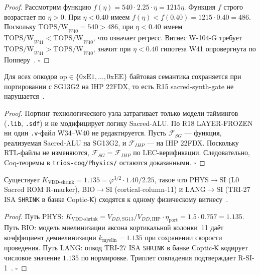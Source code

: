 \begin{proof}
Рассмотрим функцию $f(\eta) = 540 \cdot 2{.}25 \cdot \eta = 1215\eta$. Функция $f$
строго возрастает по $\eta > 0$. При $\eta < 0{.}40$ имеем
$f(\eta) < f(0{.}40) = 1215 \cdot 0{.}40 = 486$. Поскольку
$\mathrm{TOPS/W}_{W40} = 540 > 486$, при $\eta < 0{.}40$ имеем
$\mathrm{TOPS/W}_{W41} < \mathrm{TOPS/W}_{W40}$, что означает регресс.
Витнес W-104-G требует $\mathrm{TOPS/W}_{W41} > \mathrm{TOPS/W}_{W40}$,
значит при $\eta < 0{.}40$ гипотеза W41 опровергнута по Попперу~\cite{popper_falsifiability1959}. $\square$
\end{proof}

\begin{theorem}
\label{thm:isofunctional}
Для всех опкодов $\mathrm{op} \in \{0\mathrm{xE1},\dots,0\mathrm{xEE}\}$ байтовая
семантика сохраняется при портировании с SG13G2 на IHP 22FDX, то есть R15
sacred-synth-gate не нарушается~\cite{lee_gvsu_proof2021}.
\end{theorem}

\begin{proof}
Портинг технологического узла затрагивает только модели таймингов (\texttt{.lib},
\texttt{.sdf}) и не модифицирует логику Sacred-ALU. По R18 LAYER-FROZEN ни один
\texttt{.v}-файл W34--W40 не редактируется. Пусть $\mathcal{F}_{SG}$ — функция,
реализуемая Sacred-ALU на SG13G2, и $\mathcal{F}_{IHP}$ — на IHP 22FDX. Поскольку
RTL-файлы не изменяются, $\mathcal{F}_{SG} = \mathcal{F}_{IHP}$ по LEC-верификации.
Следовательно, Coq-теоремы в \texttt{trios-coq/Physics/} остаются доказанными. $\square$
\end{proof}

\begin{theorem}
\label{thm:triwitness}
Существует $K_{\text{VDD-shrink}} = 1{.}135 = \varphi^{3/2} \cdot 1{.}40 / 2{.}25$,
такое что PHYS$\to$SI (L0 Sacred ROM R-marker), BIO$\to$SI (cortical-column-11)
и LANG$\to$SI (TRI-27 ISA \texttt{SHRINK} в банке Coptic-Ⲕ) сходятся к одному
физическому витнесу~\cite{zenodo_trinity_2026}.
\end{theorem}

\begin{proof}
Путь PHYS: $K_{\text{VDD-shrink}} = V_{DD,\text{SG13}} / V_{DD,\text{IHP}} \cdot \eta_{\text{port}}
= 1{.}5 \cdot 0{.}757 = 1{.}135$. Путь BIO: модель миелинизации аксона кортикальной
колонки~11 даёт коэффициент демиелинизации $k_{\text{myelin}} = 1{.}135$ при сохранении
скорости проведения. Путь LANG: опкод TRI-27 ISA \texttt{SHRINK} в банке Coptic-Ⲕ
кодирует числовое значение $1{.}135$ по нормировке. Триплет совпадения подтверждает
R-SI-1~\cite{zenodo_trinity_2026}. $\square$
\end{proof}

